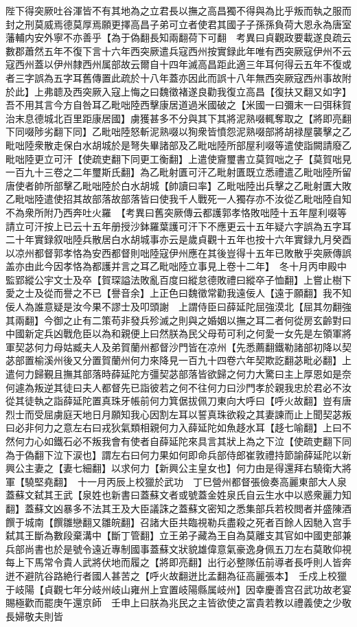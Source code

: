 陛下得突厥吐谷渾皆不有其地為之立君長以撫之高昌獨不得與為比乎叛而執之服而封之刑莫威焉德莫厚焉願更擇高昌子弟可立者使君其國子子孫孫負荷大恩永為唐室藩輔内安外寧不亦善乎【為于偽翻長知兩翻荷下可翻　考異曰貞觀政要載遂良疏云數郡蕭然五年不復下言十六年西突厥遣兵寇西州按實録此年唯有西突厥寇伊州不云寇西州蓋以伊州隸西州属部故云爾自十四年滅高昌距此適三年耳何得云五年不復或者三字誤為五字耳舊傳置此疏於十八年蓋亦因此而誤十八年無西突厥寇西州事故附於此】上弗聼及西突厥入寇上悔之曰魏徵褚遂良勸我復立高昌【復扶又翻又如字】吾不用其言今方自咎耳乙毗咄陸西擊康居道過米國破之【米國一曰彌末一曰弭秣賀治末息德城北百里距康居國】虜獲甚多不分與其下其將泥熟啜輒奪取之【將即亮翻下同啜陟劣翻下同】乙毗咄陸怒斬泥熟啜以狥衆皆憤怨泥熟啜部將胡禄屋襲擊之乙毗咄陸衆散走保白水胡城於是弩失畢諸部及乙毗咄陸所部屋利啜等遣使詣闕請廢乙毗咄陸更立可汗【使疏吏翻下同更工衡翻】上遣使齎璽書立莫賀咄之子【莫賀咄見一百九十三卷之二年璽斯氏翻】為乙毗射匱可汗乙毗射匱既立悉禮遣乙毗咄陸所留唐使者帥所部擊乙毗咄陸於白水胡城【帥讀曰率】乙毗咄陸出兵擊之乙毗射匱大敗乙毗咄陸遣使招其故部落故部落皆曰使我千人戰死一人獨存亦不汝從乙毗咄陸自知不為衆所附乃西奔吐火羅　【考異曰舊突厥傳云都護郭孝恪敗咄陸十五年屋利啜等請立可汗按上已云十五年册授沙鉢羅葉護可汗下不應更云十五年疑六字誤為五字耳二十年實録叙咄陸兵散居白水胡城事亦云是歲貞觀十五年也按十六年實録九月癸酉以凉州都督郭孝恪為安西都督則咄陸寇伊州應在其後豈得十五年已敗散乎突厥傳誤盖亦由此今因孝恪為都護并言之耳乙毗咄陸立事見上卷十二年】　冬十月丙申殿中監郢縱公宇文士及卒【賀琛謚法敗亂百度曰縱怠德敗禮曰縱卒子恤翻】上嘗止樹下愛之士及從而譽之不已【譽音余】上正色曰魏徵常勸我遠佞人【遠于願翻】我不知佞人為誰意疑是汝今果不謬士及叩頭謝　上謂侍臣曰薛延陀屈強漠北【屈其勿翻強其兩翻】今御之止有二策苟非發兵殄滅之則與之婚姻以撫之耳二者何從房玄齡對曰中國新定兵凶戰危臣以為和親便上曰然朕為民父母苟可利之何愛一女先是左領軍將軍契苾何力母姑臧夫人及弟賀蘭州都督沙門皆在凉州【先悉薦翻鐵勒諸部初降以契苾部置榆溪州後又分置賀蘭州何力來降見一百九十四卷六年契欺訖翻苾毗必翻】上遣何力歸覲且撫其部落時薛延陀方彊契苾部落皆欲歸之何力大驚曰主上厚恩如是奈何遽為叛逆其徒曰夫人都督先已詣彼若之何不往何力曰沙門孝於親我忠於君必不汝從其徒執之詣薛延陀置真珠牙帳前何力箕倨拔佩刀東向大呼曰【呼火故翻】豈有唐烈士而受屈虜庭天地日月願知我心因割左耳以誓真珠欲殺之其妻諫而止上聞契苾叛曰必非何力之意左右曰戎狄氣類相親何力入薛延陀如魚趍水耳【趍七喻翻】上曰不然何力心如鐵石必不叛我會有使者自薛延陀來具言其狀上為之下泣【使疏吏翻下同為于偽翻下泣下涙也】謂左右曰何力果如何即命兵部侍郎崔敦禮持節諭薛延陀以新興公主妻之【妻七細翻】以求何力【新興公主皇女也】何力由是得還拜右驍衛大將軍【驍堅堯翻】　十一月丙辰上校獵於武功　丁巳營州都督張儉奏高麗東部大人泉蓋蘇文弑其王武【泉姓也新書曰蓋蘇文者或號蓋金姓泉氏自云生水中以惑衆麗力知翻】蓋蘇文凶暴多不法其王及大臣議誅之蓋蘇文密知之悉集部兵若校閲者并盛陳酒饌于城南【饌雛戀翻又雛皖翻】召諸大臣共臨視勒兵盡殺之死者百餘人因馳入宫手弑其王斷為數段棄溝中【斷丁管翻】立王弟子藏為王自為莫離支其官如中國吏部兼兵部尚書也於是號令遠近專制國事蓋蘇文狀貌雄偉意氣豪逸身佩五刀左右莫敢仰視每上下馬常令貴人武將伏地而履之【將即亮翻】出行必整隊伍前導者長呼則人皆奔迸不避阬谷路絶行者國人甚苦之【呼火故翻迸比孟翻為征高麗張本】　壬戍上校獵于岐陽【貞觀七年分岐州岐山雍州上宜置岐陽縣属岐州】因幸慶善宫召武功故老宴賜極歡而罷庚午還京師　壬申上曰朕為兆民之主皆欲使之富貴若教以禮義使之少敬長婦敬夫則皆